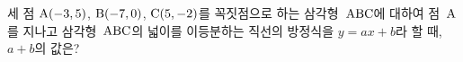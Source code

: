 세 점 $\mathrm{A}(-3{,}\mkern3mu\mathopen{}5)$, $\mathrm{B}(-7{,}\mkern3mu\mathopen{}0)$, $\mathrm{C}(5{,}\mkern3mu\mathopen{}-2)$를 꼭짓점으로 하는 삼각형~$\mathrm{ABC}$에 대하여 점~$\mathrm{A}$를 지나고 삼각형~$\mathrm{ABC}$의 넓이를 이등분하는 직선의 방정식을 $y=ax+b$라 할 때, $a+b$의 값은? 
